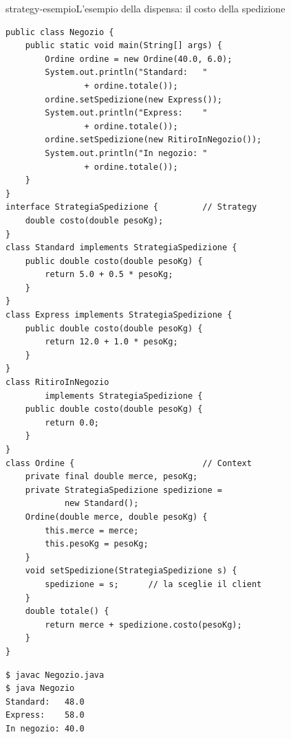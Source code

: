 \begin{programma}{strategy-esempio}{L'esempio della dispensa: il costo della spedizione}
\begin{lstlisting}[style=javacs, name=Negozio.java]
public class Negozio {
    public static void main(String[] args) {
        Ordine ordine = new Ordine(40.0, 6.0);
        System.out.println("Standard:   "
                + ordine.totale());
        ordine.setSpedizione(new Express());
        System.out.println("Express:    "
                + ordine.totale());
        ordine.setSpedizione(new RitiroInNegozio());
        System.out.println("In negozio: "
                + ordine.totale());
    }
}
interface StrategiaSpedizione {         // Strategy
    double costo(double pesoKg);
}
class Standard implements StrategiaSpedizione {
    public double costo(double pesoKg) {
        return 5.0 + 0.5 * pesoKg;
    }
}
class Express implements StrategiaSpedizione {
    public double costo(double pesoKg) {
        return 12.0 + 1.0 * pesoKg;
    }
}
class RitiroInNegozio
        implements StrategiaSpedizione {
    public double costo(double pesoKg) {
        return 0.0;
    }
}
class Ordine {                          // Context
    private final double merce, pesoKg;
    private StrategiaSpedizione spedizione =
            new Standard();
    Ordine(double merce, double pesoKg) {
        this.merce = merce;
        this.pesoKg = pesoKg;
    }
    void setSpedizione(StrategiaSpedizione s) {
        spedizione = s;      // la sceglie il client
    }
    double totale() {
        return merce + spedizione.costo(pesoKg);
    }
}
\end{lstlisting}
\tcblower
{}

\medskip
\begin{lstlisting}[style=shellcs, name=Terminale]
$ javac Negozio.java
$ java Negozio
Standard:   48.0
Express:    58.0
In negozio: 40.0
\end{lstlisting}
\end{programma}

